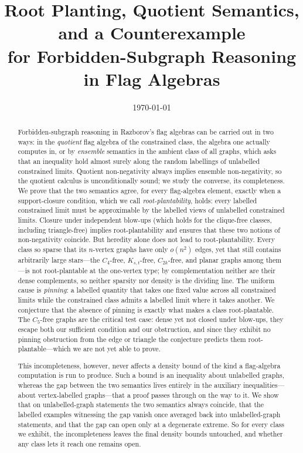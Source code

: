 \documentclass[11pt]{article}
\title{Root Planting, Quotient Semantics, and a Counterexample\\
       for Forbidden-Subgraph Reasoning in Flag Algebras}
\author{}
\date{\today}
\theoremstyle{definition}
\begin{document}
\maketitle

\begin{abstract}
Forbidden-subgraph reasoning in Razborov's flag algebras can be carried out in two
ways: in the \emph{quotient} flag algebra of the constrained class, the algebra one
actually computes in, or by \emph{ensemble} semantics in the ambient class of all graphs, which
asks that an inequality hold almost surely along the random labellings of unlabelled
constrained limits.  Quotient
non-negativity always implies ensemble non-negativity, so the quotient calculus is
unconditionally sound; we study the converse, its completeness.  We prove that the two
semantics agree, for every flag-algebra element, exactly when a support-closure
condition, which we call \emph{root-plantability}, holds: every labelled constrained limit
must be approximable by the labelled views of unlabelled constrained limits. Closure under
independent blow-ups (which holds for the clique-free classes, including triangle-free) implies root-plantability and ensures that these two notions of non-negativity coincide. But heredity alone does not lead to root-plantability.  Every class so
sparse that its $n$-vertex graphs have only $o(n^2)$ edges, yet that still contains
arbitrarily large stars---the $C_4$-free, $K_{s,t}$-free, $C_{2k}$-free, and planar
graphs among them---is not root-plantable at the one-vertex type; by complementation neither are their dense
complements, so neither sparsity nor density is the dividing line.  The uniform cause is
\emph{pinning}: a labelled quantity that takes one fixed value across all constrained
limits while the constrained class admits a labelled limit where it takes another.  We conjecture
that the absence of pinning is exactly what makes a class root-plantable.  The $C_5$-free
graphs are the critical test case: dense yet not closed under blow-ups, they escape both
our sufficient condition and our obstruction, and since they exhibit no pinning
obstruction from the edge or triangle the conjecture predicts them
root-plantable---which we are not yet able to prove.

This incompleteness, however, never affects a density bound of the kind a flag-algebra
computation is run to produce.  Such a bound is an inequality about unlabelled graphs, whereas
the gap between the two semantics lives entirely in the auxiliary inequalities---about
vertex-labelled graphs---that a proof passes through on the way to it.  We show
that on unlabelled-graph statements the two semantics always coincide, that the labelled
examples witnessing the gap vanish once averaged back into unlabelled-graph statements, and
that the gap can open only at a degenerate extreme.  So for every class we exhibit, the
incompleteness leaves the final density bounds untouched, and whether any class lets it
reach one remains open.
\end{abstract}
\end{document}
